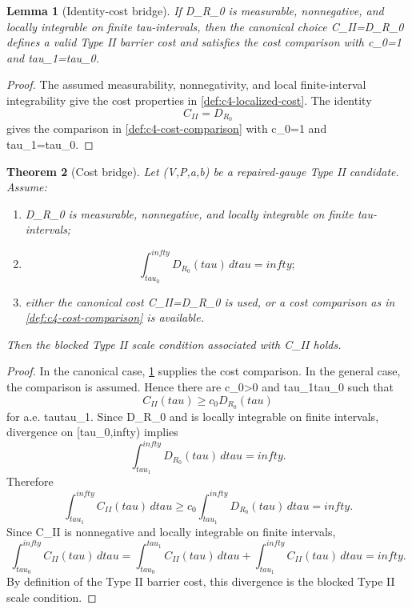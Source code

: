 \documentclass[11pt]{amsart}
\def\({}%
\def\){}%
\def\tilde#1{#1}%
\def\mathfrak#1{#1}%
\def\mathrm#1{#1}%
\def\tau{tau}%
\def\infty{infty}%
\theoremstyle{plain}
\newtheorem{theorem}{Theorem}[section]
\newtheorem{lemma}[theorem]{Lemma}
\theoremstyle{definition}
\theoremstyle{remark}
\begin{document}
\begin{lemma}[Identity-cost bridge]
\label{lem:c4-identity-cost}
If \(\tilde{\mathfrak D}_{R_0}\) is measurable, nonnegative, and locally
integrable on finite \(\tau\)-intervals, then the canonical choice
\(\mathfrak C_{\mathrm{II}}=\tilde{\mathfrak D}_{R_0}\) defines a valid Type II
barrier cost and satisfies the cost comparison with \(c_0=1\) and
\(\tau_1=\tau_0\).
\end{lemma}

\begin{proof}
The assumed measurability, nonnegativity, and local finite-interval
integrability give the cost properties in \cref{def:c4-localized-cost}.  The
identity
\[
  \mathfrak C_{\mathrm{II}}=\tilde{\mathfrak D}_{R_0}
\]
gives the comparison in \cref{def:c4-cost-comparison} with \(c_0=1\) and
\(\tau_1=\tau_0\).
\end{proof}

\begin{theorem}[Cost bridge]
\label{thm:c4-cost-bridge}
Let \((V,P,a,b)\) be a repaired-gauge Type II candidate.  Assume:
\begin{enumerate}[label=\textup{(\roman*)}]
\item \(\tilde{\mathfrak D}_{R_0}\) is measurable, nonnegative, and locally
integrable on finite \(\tau\)-intervals;
\item
\[
  \int_{\tau_0}^{\infty}
  \tilde{\mathfrak D}_{R_0}(\tau)\,d\tau=\infty;
\]
\item either the canonical cost
\(\mathfrak C_{\mathrm{II}}=\tilde{\mathfrak D}_{R_0}\) is used, or a cost
comparison as in \cref{def:c4-cost-comparison} is available.
\end{enumerate}
Then the blocked Type II scale condition associated with
\(\mathfrak C_{\mathrm{II}}\) holds.
\end{theorem}

\begin{proof}
In the canonical case, \cref{lem:c4-identity-cost} supplies the cost comparison.
In the general case, the comparison is assumed.  Hence there are
\(c_0>0\) and \(\tau_1\ge\tau_0\) such that
\[
  \mathfrak C_{\mathrm{II}}(\tau)
  \ge c_0\tilde{\mathfrak D}_{R_0}(\tau)
\]
for a.e. \(\tau\ge\tau_1\).  Since
\(\tilde{\mathfrak D}_{R_0}\) and is locally integrable on finite
intervals, divergence on \([\tau_0,\infty)\) implies
\[
  \int_{\tau_1}^{\infty}
  \tilde{\mathfrak D}_{R_0}(\tau)\,d\tau=\infty.
\]
Therefore
\[
  \int_{\tau_1}^{\infty}
  \mathfrak C_{\mathrm{II}}(\tau)\,d\tau
  \ge
  c_0\int_{\tau_1}^{\infty}
  \tilde{\mathfrak D}_{R_0}(\tau)\,d\tau
  =\infty.
\]
Since \(\mathfrak C_{\mathrm{II}}\) is nonnegative and locally integrable on
finite intervals,
\[
  \int_{\tau_0}^{\infty}
  \mathfrak C_{\mathrm{II}}(\tau)\,d\tau
  =
  \int_{\tau_0}^{\tau_1}\mathfrak C_{\mathrm{II}}(\tau)\,d\tau
  +
  \int_{\tau_1}^{\infty}\mathfrak C_{\mathrm{II}}(\tau)\,d\tau
  =\infty.
\]
By definition of the Type II barrier cost, this divergence is the blocked Type
II scale condition.
\end{proof}
\end{document}
